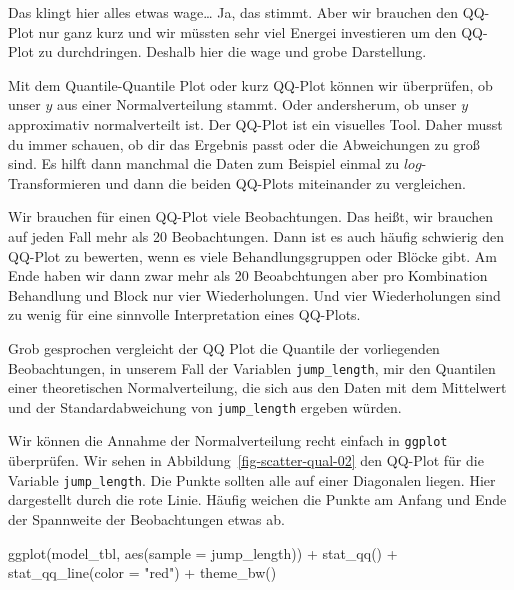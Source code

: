 \documentclass[
  letterpaper,
]{scrbook}
\newenvironment{Shaded}{\begin{snugshade}}{\end{snugshade}}
\newcommand{\AttributeTok}[1]{\textcolor[rgb]{0.40,0.45,0.13}{#1}}
\newcommand{\FunctionTok}[1]{\textcolor[rgb]{0.28,0.35,0.67}{#1}}
\newcommand{\NormalTok}[1]{\textcolor[rgb]{0.00,0.23,0.31}{#1}}
\newcommand{\SpecialCharTok}[1]{\textcolor[rgb]{0.37,0.37,0.37}{#1}}
\newcommand{\StringTok}[1]{\textcolor[rgb]{0.13,0.47,0.30}{#1}}
\begin{document}
Das klingt hier alles etwas wage\ldots{} Ja, das stimmt. Aber wir
brauchen den QQ-Plot nur ganz kurz und wir müssten sehr viel Energei
investieren um den QQ-Plot zu durchdringen. Deshalb hier die wage und
grobe Darstellung.

Mit dem Quantile-Quantile Plot oder kurz QQ-Plot können wir überprüfen,
ob unser \(y\) aus einer Normalverteilung stammt. Oder andersherum, ob
unser \(y\) approximativ normalverteilt ist. Der QQ-Plot ist ein
visuelles Tool. Daher musst du immer schauen, ob dir das Ergebnis passt
oder die Abweichungen zu groß sind. Es hilft dann manchmal die Daten zum
Beispiel einmal zu \(log\)-Transformieren und dann die beiden QQ-Plots
miteinander zu vergleichen.

Wir brauchen für einen QQ-Plot viele Beobachtungen. Das heißt, wir
brauchen auf jeden Fall mehr als 20 Beobachtungen. Dann ist es auch
häufig schwierig den QQ-Plot zu bewerten, wenn es viele
Behandlungsgruppen oder Blöcke gibt. Am Ende haben wir dann zwar mehr
als 20 Beoabchtungen aber pro Kombination Behandlung und Block nur vier
Wiederholungen. Und vier Wiederholungen sind zu wenig für eine sinnvolle
Interpretation eines QQ-Plots.

Grob gesprochen vergleicht der QQ Plot die Quantile der vorliegenden
Beobachtungen, in unserem Fall der Variablen \texttt{jump\_length}, mir
den Quantilen einer theoretischen Normalverteilung, die sich aus den
Daten mit dem Mittelwert und der Standardabweichung von
\texttt{jump\_length} ergeben würden.

Wir können die Annahme der Normalverteilung recht einfach in
\texttt{ggplot} überprüfen. Wir sehen in
Abbildung~\ref{fig-scatter-qual-02} den QQ-Plot für die Variable
\texttt{jump\_length}. Die Punkte sollten alle auf einer Diagonalen
liegen. Hier dargestellt durch die rote Linie. Häufig weichen die Punkte
am Anfang und Ende der Spannweite der Beobachtungen etwas ab.

\begin{Shaded}
\begin{Highlighting}[]
\FunctionTok{ggplot}\NormalTok{(model\_tbl, }\FunctionTok{aes}\NormalTok{(}\AttributeTok{sample =}\NormalTok{ jump\_length)) }\SpecialCharTok{+} 
  \FunctionTok{stat\_qq}\NormalTok{() }\SpecialCharTok{+} 
  \FunctionTok{stat\_qq\_line}\NormalTok{(}\AttributeTok{color =} \StringTok{"red"}\NormalTok{) }\SpecialCharTok{+}
  \FunctionTok{theme\_bw}\NormalTok{()}
\end{Highlighting}
\end{Shaded}
\end{document}
